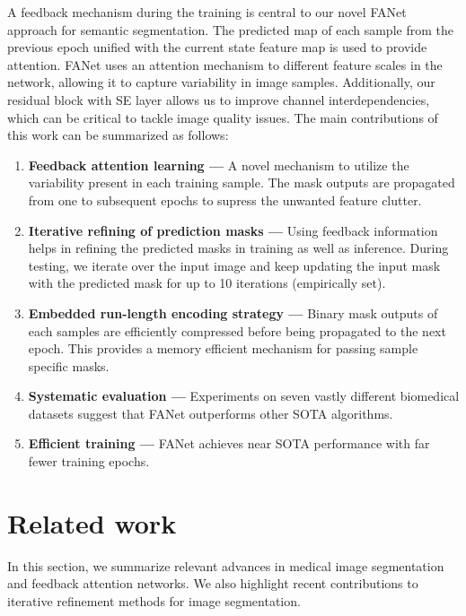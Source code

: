 \documentclass[journal]{IEEEtran}
\begin{document}
{A} feedback mechanism {during the training is} central to our novel \ac{FANet} approach for semantic segmentation. The predicted map of each sample from the previous epoch {unified with the current state feature map} is used to provide attention. FANet uses an attention mechanism to different feature scales in the network, allowing it to capture variability in image samples. Additionally, our residual block with \ac{SE} layer allows us to improve channel interdependencies, which can be critical to tackle image quality issues. 
The main contributions of this work can be summarized as follows:
\begin{enumerate}


    \item \textbf{Feedback attention learning --- } A novel mechanism to utilize the variability present in each training sample. The mask outputs are propagated from one to subsequent epochs to supress the unwanted feature clutter.

   \item \textbf{Iterative refining of prediction masks --- } Using feedback information helps in refining the predicted masks in training as well as inference. During testing, we iterate over the input image and keep updating the input mask with the predicted mask {for up to 10 iterations (empirically set)}.
\item \textbf{Embedded run-length encoding strategy --- } Binary mask outputs of each samples are efficiently compressed before being propagated to the next epoch. This provides a memory efficient mechanism for passing sample specific masks.
\item \textbf{Systematic evaluation --- } Experiments on seven vastly different biomedical datasets suggest that FANet outperforms other \ac{SOTA} algorithms.

    \item \textbf{Efficient training --- } FANet achieves near \ac{SOTA} performance with far fewer training epochs. 
\end{enumerate}

\section{Related work}
\label{relatedwork}
In this section, we summarize relevant advances in medical image segmentation {and} feedback attention networks. {We also highlight} recent contributions to iterative refinement methods for image segmentation. 
\end{document}
